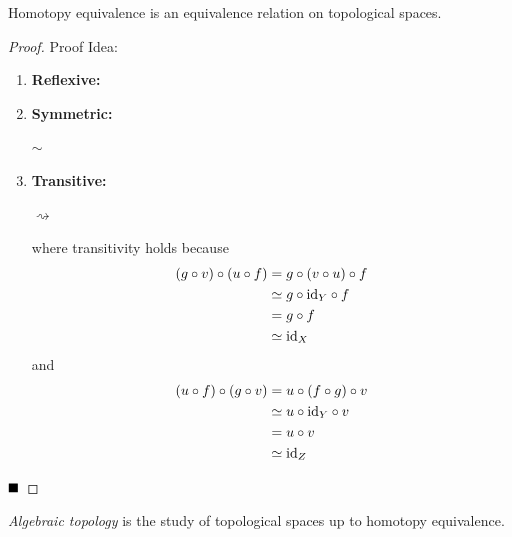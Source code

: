\begin{lemma}
    Homotopy equivalence is an equivalence relation on topological spaces.
\end{lemma}
\begin{proof}{Proof Idea:}
    \begin{enumerate}
        \item \textbf{Reflexive:}
        \begin{center}
        \end{center}
        \item \textbf{Symmetric:}
        \begin{center}
            $\sim$
        \end{center}
        \item \textbf{Transitive:}
        \begin{center}
            $\rightsquigarrow$
        \end{center}
       where transitivity holds because
        \begin{align*}
            (g \circ v) \circ (u \circ f) &= g \circ (v \circ u) \circ f\\
            &\simeq g \circ \text{id}_Y \circ f\\
            &= g \circ f\\
            &\simeq \text{id}_X
        \end{align*}
        and
        \begin{align*}
            (u \circ f) \circ (g \circ v) &= u \circ (f \circ g) \circ v\\
            &\simeq u \circ \text{id}_Y \circ v\\
            &= u \circ v\\
            &\simeq \text{id}_Z
        \end{align*}
    \end{enumerate}

    $\qed$
\end{proof}

\begin{definition}
    \emph{Algebraic topology} is the study of topological spaces up to homotopy equivalence.
\end{definition}
